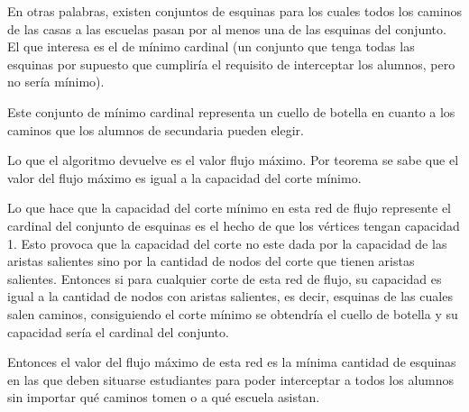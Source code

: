 En otras palabras, existen conjuntos de esquinas para los cuales todos los caminos de las casas a las escuelas pasan por al menos una de las esquinas del conjunto. El que interesa es el de mínimo cardinal (un conjunto que tenga todas las esquinas por supuesto que cumpliría el requisito de interceptar los alumnos, pero no sería mínimo).

Este conjunto de mínimo cardinal representa un cuello de botella en cuanto a los caminos que los alumnos de secundaria pueden elegir.

Lo que el algoritmo devuelve es el valor flujo máximo. Por teorema se sabe que el valor del flujo máximo es igual a la capacidad del corte mínimo.

Lo que hace que la capacidad del corte mínimo en esta red de flujo represente el cardinal del conjunto de esquinas es el hecho de que los vértices tengan capacidad 1. Esto provoca que la capacidad del corte no este dada por la capacidad de las aristas salientes sino por la cantidad de nodos del corte que tienen aristas salientes. Entonces si para cualquier corte de esta red de flujo, su capacidad es igual a la cantidad de nodos con aristas salientes, es decir, esquinas de las cuales salen caminos, consiguiendo el corte mínimo se obtendría el cuello de botella y su capacidad sería el cardinal del conjunto.

Entonces el valor del flujo máximo de esta red es la mínima cantidad de esquinas en las que deben situarse estudiantes para poder interceptar a todos los alumnos sin importar qué caminos tomen o a qué escuela asistan.